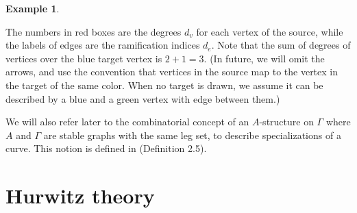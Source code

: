\documentclass[thesis]{thesis-umich}           %
\theoremstyle{definition}
\newtheorem{eg}[thm]{Example}
\begin{document}
\begin{eg}
\begin{figure}[h]
                                      \end{figure}

                                      The numbers in red boxes are the degrees $d_v$ for each vertex of the
                                      source, while the labels of edges
                                      are the ramification indices $d_e$.
                                      Note that the sum of degrees of
                                      vertices over the blue target
                                      vertex is $2+1=3$. (In future, we will omit the arrows, and use the convention that vertices in the source map to the vertex in
  the target of the same color. When no target is drawn, we assume it can be described by a blue and a green vertex with edge between them.)

\end{eg}

We will also refer later to the combinatorial concept
of an $A$-structure on $\Gamma$ where $A$ and $\Gamma$
are stable graphs with the same leg set, to describe
specializations of a curve. This notion is
defined in \cite{Schmitt} (Definition 2.5).

\section{Hurwitz theory}
\end{document}
